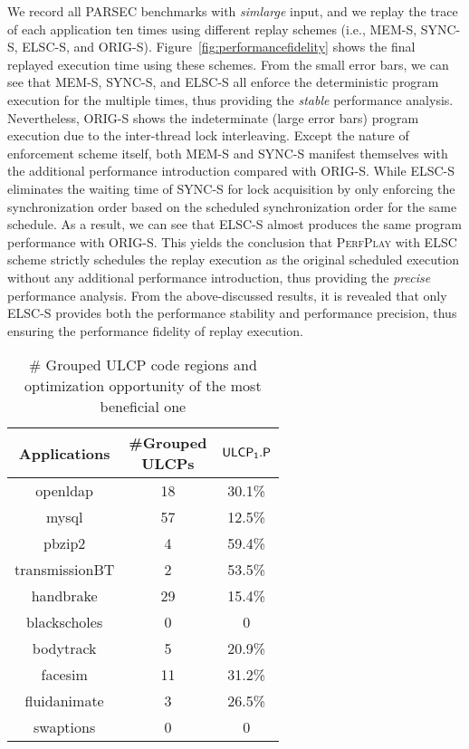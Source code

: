 We record all PARSEC benchmarks with \emph{simlarge} input, and we replay the trace of each application ten times using different replay schemes (i.e., MEM-S, SYNC-S, ELSC-S, and ORIG-S). Figure~\ref{fig:performancefidelity} shows the final replayed execution time using these schemes. {From the small error bars, we can see that MEM-S, SYNC-S, and ELSC-S all enforce the deterministic program execution for the multiple times}, thus providing the \emph{stable} performance analysis. Nevertheless, ORIG-S shows the indeterminate {(large error bars)} program execution due to the inter-thread lock interleaving. Except the nature of enforcement scheme itself, both MEM-S and SYNC-S manifest themselves with the additional performance introduction compared with ORIG-S. While ELSC-S eliminates the waiting time of SYNC-S for lock acquisition by only enforcing the synchronization order based on the scheduled synchronization order for the same schedule. As a result, we can see that ELSC-S almost produces the same program performance with ORIG-S. This yields the conclusion that \textsc{PerfPlay} with ELSC scheme strictly schedules the replay execution as the original scheduled execution without any additional performance introduction, thus providing the \emph{precise} performance analysis. {From the above-discussed results, it is revealed that only ELSC-S provides both the performance stability and performance precision, thus ensuring the performance fidelity of replay execution.}


\begin{table}[tbp]   \caption{\# Grouped ULCP code regions and optimization opportunity of the most beneficial one}
\small
\tabcolsep=0.1cm
\setlength{\abovecaptionskip}{10pt}
\setlength{\belowcaptionskip}{-10pt}
\centering
\begin{tabular}{|c|c|c|}\hline
\textbf{Applications}& \minitab[c]{\#Grouped\\ULCPs}& \textbf{$\sf ULCP_1.P$} \\ \hline \hline
{\sf openldap}&18 &30.1\%  \\
{\sf mysql}&57 &12.5\%  \\\hline
{\sf pbzip2}&4 &59.4\%  \\
{\sf transmissionBT}&2 &53.5\% \\
{\sf handbrake}&29 &15.4\%  \\ \hline
{\sf blackscholes}&0 &0  \\
{\sf bodytrack}&5 &20.9\%  \\
{\sf facesim}&11 & 31.2\% \\
{\sf fluidanimate}&3 &26.5\%  \\
{\sf swaptions}&0 &0  \\ \hline
\end{tabular}
\label{table:region}
\end{table}
